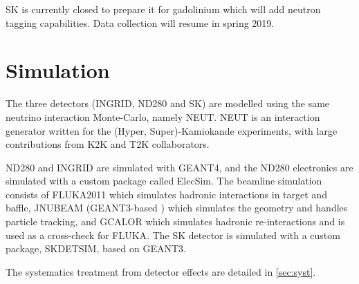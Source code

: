 SK is currently closed to prepare it for gadolinium which will add neutron tagging capabilities. Data collection will resume in spring 2019\cite{superk_upgrade}.

\section{Simulation}
The three detectors (INGRID, ND280 and SK) are modelled using the same neutrino interaction Monte-Carlo, namely NEUT\cite{neut}. NEUT is an interaction generator written for the (Hyper, Super)-Kamiokande experiments, with large contributions from K2K and T2K collaborators.

ND280 and INGRID are simulated with GEANT4\cite{t2k_det,geant4}, and the ND280 electronics are simulated with a custom package called ElecSim. The beamline simulation consists of FLUKA2011 \cite{fluka2008_1, fluka2008_2, fluka2011} which simulates hadronic interactions in target and baffle, JNUBEAM (GEANT3-based \cite{geant3}) which simulates the geometry and handles particle tracking, and GCALOR \cite{gcalor} which simulates hadronic re-interactions and is used as a cross-check for FLUKA\cite{t2k_beam, t2k_tn_flux}. The SK detector is simulated with a custom package, SKDETSIM\cite{t2k_sk}, based on GEANT3\cite{geant3}.

The systematics treatment from detector effects are detailed in \autoref{sec:syst}.
